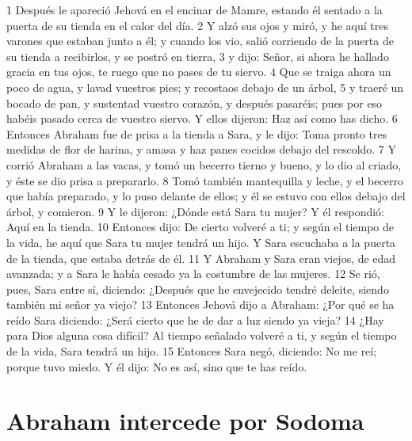 1 Después le apareció Jehová en el encinar de Mamre, estando él sentado a la puerta de su tienda en el calor del día.
2 Y alzó sus ojos y miró, y he aquí tres varones que estaban junto a él; y cuando los vio, salió corriendo de la puerta de su tienda a recibirlos, y se postró en tierra,
3 y dijo: Señor, si ahora he hallado gracia en tus ojos, te ruego que no pases de tu siervo.
4 Que se traiga ahora un poco de agua, y lavad vuestros pies; y recostaos debajo de un árbol,
5 y traeré un bocado de pan, y sustentad vuestro corazón, y después pasaréis; pues por eso habéis pasado cerca de vuestro siervo. Y ellos dijeron: Haz así como has dicho.
6 Entonces Abraham fue de prisa a la tienda a Sara, y le dijo: Toma pronto tres medidas de flor de harina, y amasa y haz panes cocidos debajo del rescoldo.
7 Y corrió Abraham a las vacas, y tomó un becerro tierno y bueno, y lo dio al criado, y éste se dio prisa a prepararlo.
8 Tomó también mantequilla y leche, y el becerro que había preparado, y lo puso delante de ellos; y él se estuvo con ellos debajo del árbol, y comieron.
9 Y le dijeron: ¿Dónde está Sara tu mujer? Y él respondió: Aquí en la tienda.
10 Entonces dijo: De cierto volveré a ti; y según el tiempo de la vida, he aquí que Sara tu mujer tendrá un hijo. Y Sara escuchaba a la puerta de la tienda, que estaba detrás de él.
11 Y Abraham y Sara eran viejos, de edad avanzada; y a Sara le había cesado ya la costumbre de las mujeres.
12 Se rió, pues, Sara entre sí, diciendo: ¿Después que he envejecido tendré deleite, siendo también mi señor ya viejo?
13 Entonces Jehová dijo a Abraham: ¿Por qué se ha reído Sara diciendo: ¿Será cierto que he de dar a luz siendo ya vieja?
14 ¿Hay para Dios alguna cosa difícil? Al tiempo señalado volveré a ti, y según el tiempo de la vida, Sara tendrá un hijo.
15 Entonces Sara negó, diciendo: No me reí; porque tuvo miedo. Y él dijo: No es así, sino que te has reído.

\section{Abraham intercede por Sodoma}

